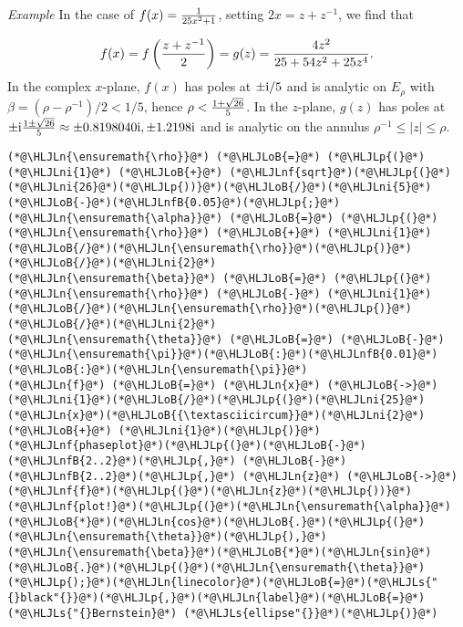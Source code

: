 \documentclass[12pt,landscape]{article}
\newcommand{\HLJLn}[1]{#1}
\newcommand{\HLJLnf}[1]{\textcolor[RGB]{66,102,213}{#1}}
\newcommand{\HLJLs}[1]{\textcolor[RGB]{201,61,57}{#1}}
\newcommand{\HLJLnfB}[1]{\textcolor[RGB]{59,151,46}{#1}}
\newcommand{\HLJLni}[1]{\textcolor[RGB]{59,151,46}{#1}}
\newcommand{\HLJLoB}[1]{\textcolor[RGB]{102,102,102}{\textbf{#1}}}
\newcommand{\HLJLp}[1]{#1}
\def\I{ {\rm i} }
\begin{document}
{\newpage
\emph{Example}  In the case of $f(x) = {1 \over 25 x^2 + 1}$, setting $2x = z + z^{-1}$, we find that

\[
f(x) = f\left( {z+z^{-1} \over 2 } \right) = g(z) = {4 z^2 \over 25 + 54 z^2 + 25 z^4}.
\]
In the complex $x$-plane, $f(x)$ has poles at $\pm \I/5$ and is analytic on $E_{\rho}$ with $\beta = (\rho - \rho^{-1})/2 < 1/5$, hence $\rho < { 1 + \sqrt{26} \over 5 }$. In the $z$-plane, $g(z)$ has poles at $\pm \I { 1 \pm \sqrt{26} \over 5 } \approx \pm 0.8198040\I,\pm1.2198\I$ and is analytic on the annulus $\rho^{-1} \leq \vert z \vert \leq \rho$.


\begin{lstlisting}
(*@\HLJLn{\ensuremath{\rho}}@*) (*@\HLJLoB{=}@*) (*@\HLJLp{(}@*)(*@\HLJLni{1}@*) (*@\HLJLoB{+}@*) (*@\HLJLnf{sqrt}@*)(*@\HLJLp{(}@*)(*@\HLJLni{26}@*)(*@\HLJLp{))}@*)(*@\HLJLoB{/}@*)(*@\HLJLni{5}@*)(*@\HLJLoB{-}@*)(*@\HLJLnfB{0.05}@*)(*@\HLJLp{;}@*)
(*@\HLJLn{\ensuremath{\alpha}}@*) (*@\HLJLoB{=}@*) (*@\HLJLp{(}@*)(*@\HLJLn{\ensuremath{\rho}}@*) (*@\HLJLoB{+}@*) (*@\HLJLni{1}@*)(*@\HLJLoB{/}@*)(*@\HLJLn{\ensuremath{\rho}}@*)(*@\HLJLp{)}@*)(*@\HLJLoB{/}@*)(*@\HLJLni{2}@*)
(*@\HLJLn{\ensuremath{\beta}}@*) (*@\HLJLoB{=}@*) (*@\HLJLp{(}@*)(*@\HLJLn{\ensuremath{\rho}}@*) (*@\HLJLoB{-}@*) (*@\HLJLni{1}@*)(*@\HLJLoB{/}@*)(*@\HLJLn{\ensuremath{\rho}}@*)(*@\HLJLp{)}@*)(*@\HLJLoB{/}@*)(*@\HLJLni{2}@*)
(*@\HLJLn{\ensuremath{\theta}}@*) (*@\HLJLoB{=}@*) (*@\HLJLoB{-}@*)(*@\HLJLn{\ensuremath{\pi}}@*)(*@\HLJLoB{:}@*)(*@\HLJLnfB{0.01}@*)(*@\HLJLoB{:}@*)(*@\HLJLn{\ensuremath{\pi}}@*)
(*@\HLJLn{f}@*) (*@\HLJLoB{=}@*) (*@\HLJLn{x}@*) (*@\HLJLoB{->}@*) (*@\HLJLni{1}@*)(*@\HLJLoB{/}@*)(*@\HLJLp{(}@*)(*@\HLJLni{25}@*)(*@\HLJLn{x}@*)(*@\HLJLoB{{\textasciicircum}}@*)(*@\HLJLni{2}@*) (*@\HLJLoB{+}@*) (*@\HLJLni{1}@*)(*@\HLJLp{)}@*)
(*@\HLJLnf{phaseplot}@*)(*@\HLJLp{(}@*)(*@\HLJLoB{-}@*)(*@\HLJLnfB{2..2}@*)(*@\HLJLp{,}@*) (*@\HLJLoB{-}@*)(*@\HLJLnfB{2..2}@*)(*@\HLJLp{,}@*) (*@\HLJLn{z}@*) (*@\HLJLoB{->}@*) (*@\HLJLnf{f}@*)(*@\HLJLp{(}@*)(*@\HLJLn{z}@*)(*@\HLJLp{))}@*)
(*@\HLJLnf{plot!}@*)(*@\HLJLp{(}@*)(*@\HLJLn{\ensuremath{\alpha}}@*)(*@\HLJLoB{*}@*)(*@\HLJLn{cos}@*)(*@\HLJLoB{.}@*)(*@\HLJLp{(}@*)(*@\HLJLn{\ensuremath{\theta}}@*)(*@\HLJLp{),}@*)(*@\HLJLn{\ensuremath{\beta}}@*)(*@\HLJLoB{*}@*)(*@\HLJLn{sin}@*)(*@\HLJLoB{.}@*)(*@\HLJLp{(}@*)(*@\HLJLn{\ensuremath{\theta}}@*)(*@\HLJLp{);}@*)(*@\HLJLn{linecolor}@*)(*@\HLJLoB{=}@*)(*@\HLJLs{"{}black"{}}@*)(*@\HLJLp{,}@*)(*@\HLJLn{label}@*)(*@\HLJLoB{=}@*)(*@\HLJLs{"{}Bernstein}@*) (*@\HLJLs{ellipse"{}}@*)(*@\HLJLp{)}@*)
\end{lstlisting}

}
\end{document}
